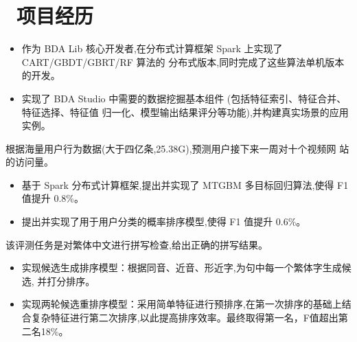 \documentclass{resume}
\begin{document}

\section{\faUsers\ 项目经历}
\begin{itemize}
  \item 作为 BDA Lib 核心开发者,在分布式计算框架 Spark 上实现了 CART/GBDT/GBRT/RF 算法的 分布式版本,同时完成了这些算法单机版本的开发。
  \item 实现了 BDA Studio 中需要的数据挖掘基本组件 (包括特征索引、特征合并、特征选择、特征值 归一化、模型输出结果评分等功能),并构建真实场景的应用实例。
\end{itemize}

\vspace{-1.5ex}

\begin{onehalfspacing}
根据海量用户行为数据(大于四亿条,25.38G),预测用户接下来一周对十个视频网
站的访问量。
\begin{itemize}
  \item 基于 Spark 分布式计算框架,提出并实现了 MTGBM 多目标回归算法,使得 F1 值提升 0.8\%。
  \item 提出并实现了用于用户分类的概率排序模型,使得 F1 值提升 0.6\%。
\end{itemize}
\end{onehalfspacing}

\vspace{-1.5ex}

\begin{onehalfspacing}
该评测任务是对繁体中文进行拼写检查,给出正确的拼写结果。
\begin{itemize}
  \item 实现候选生成排序模型：根据同音、近音、形近字,为句中每一个繁体字生成候选, 并打分排序。
  \item 实现两轮候选重排序模型：采用简单特征进行预排序,在第一次排序的基础上结合复杂特征进行第二次排序,以此提高排序效率。最终取得第一名，F值超出第二名18\%。
\end{itemize}
\end{onehalfspacing}
\end{document}
